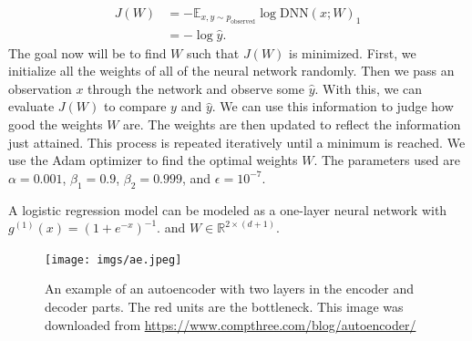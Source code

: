 \documentclass{article}
\begin{document}
\begin{align*}
    J(W)
    &= -\mathbb{E}_{x,y \sim p_{\text{observed}}}\log \mathrm{DNN}(x;W)_1 \\
    &= -\log \hat{y}.
\end{align*}
The goal now will be to find $W$ such that $J(W)$ is minimized. First, we initialize all the weights of all of the neural network randomly. Then we pass an observation $x$ through the network and observe some $\hat{y}.$ With this, we can evaluate $J(W)$ to compare $y$ and $\hat{y}.$ We can use this information to judge how good the weights $W$ are. The weights are then updated to reflect the information just attained. This process is repeated iteratively until a minimum is reached. We use the Adam optimizer \cite{adam} to find the optimal weights $W.$ The parameters used are $\alpha=0.001$,  $\beta_1=0.9$, $\beta_2=0.999$, and $\epsilon=10^{-7}.$

A logistic regression model can be modeled as a one-layer neural network with $g^{(1)}(x) = (1+e^{-x})^{-1}.$ and $W \in \mathbb{R}^{2 \times (d + 1)}$.

\begin{figure}[t]
    \centering
    \texttt{[image: imgs/ae.jpeg]}
    \caption{An example of an autoencoder with two layers in the encoder and decoder parts. The red units are the bottleneck. This image was downloaded from \url{https://www.compthree.com/blog/autoencoder/}}
    \label{fig:ae}
\end{figure}
\end{document}
